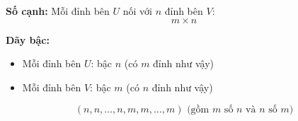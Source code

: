 \documentclass{article}
\begin{document}
\begin{itemize}
\begin{center}
	 \end{center}
	 
	 \textbf{Số cạnh:} Mỗi đỉnh bên $U$ nối với $n$ đỉnh bên $V$: 
	 \[
	 m \times n
	 \]
	 
	 \textbf{Dãy bậc:}
	 \begin{itemize}
	 	\item Mỗi đỉnh bên $U$: bậc $n$ (có $m$ đỉnh như vậy)
	 	\item Mỗi đỉnh bên $V$: bậc $m$ (có $n$ đỉnh như vậy)
	 \end{itemize}
	 \[
	 (n, n, \ldots, n, m, m, \ldots, m) \text{ (gồm $m$ số $n$ và $n$ số $m$)}
	 \]
	 
	\end{itemize}
	
	
\end{document}
